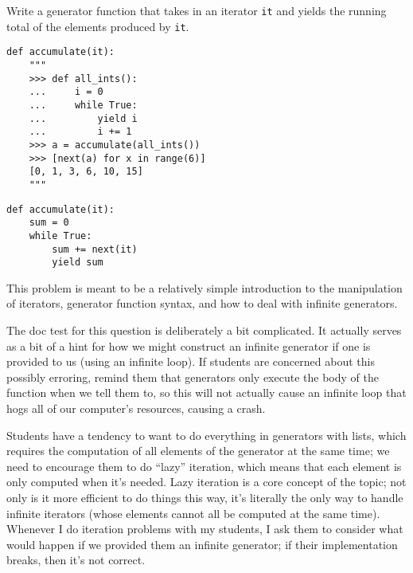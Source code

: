 \begin{blocksection}
\question Write a generator function that takes in an iterator \lstinline{it} and yields the running total of the elements produced by \lstinline{it}. 

\begin{lstlisting}
def accumulate(it):
    """
    >>> def all_ints():
    ...     i = 0
    ...     while True:
    ...         yield i
    ...         i += 1
    >>> a = accumulate(all_ints())
    >>> [next(a) for x in range(6)]
    [0, 1, 3, 6, 10, 15]
    """
\end{lstlisting}

\begin{solution}[2in]
\begin{lstlisting}
def accumulate(it):
    sum = 0
    while True:
        sum += next(it)
        yield sum
\end{lstlisting}
\end{solution}
\end{blocksection}

\begin{questionmeta}
This problem is meant to be a relatively simple introduction to the manipulation of iterators, generator function syntax, and how to deal with infinite generators. 

The doc test for this question is deliberately a bit complicated. It actually serves as a bit of a hint for how we might construct an infinite generator if one is provided to us (using an infinite loop). If students are concerned about this possibly erroring, remind them that generators only execute the body of the function when we tell them to, so this will not actually cause an infinite loop that hogs all of our computer's resources, causing a crash. 

Students have a tendency to want to do everything in generators with lists, which requires the computation of all elements of the generator at the same time; we need to encourage them to do ``lazy'' iteration, which means that each element is only computed when it's needed. Lazy iteration is a core concept of the topic; not only is it more efficient to do things this way, it's literally the only way to handle infinite iterators (whose elements cannot all be computed at the same time). Whenever I do iteration problems with my students, I ask them to consider what would happen if we provided them an infinite generator; if their implementation breaks, then it's not correct. 
\end{questionmeta}